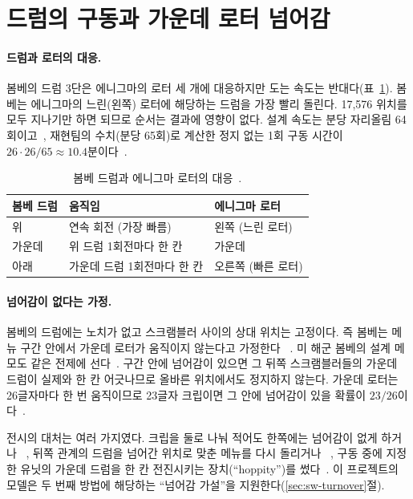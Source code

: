 \section{드럼의 구동과 가운데 로터 넘어감}\label{sec:turnover}

\paragraph{드럼과 로터의 대응.} 봄베의 드럼 3단은 에니그마의 로터 세 개에 대응하지만 도는 속도는
반대다(표~\ref{tab:drums}). 봄베는 에니그마의 느린(왼쪽) 로터에 해당하는 드럼을 가장 빨리 돌린다.
17,576 위치를 모두 지나기만 하면 되므로 순서는 결과에 영향이 없다. 설계 속도는 분당 자리올림
64회이고~\cite[59]{us6812report1944}, 재현팀의 수치(분당 65회)로 계산한 정지 없는 1회 구동 시간이
$26\cdot26/65 \approx 10.4$분이다~\cite{jackson-bh09,jackson-bh11}.

\begin{table}[ht]
\centering
\caption{봄베 드럼과 에니그마 로터의 대응~\cite[59, 73]{us6812report1944}.}
\label{tab:drums}
\begin{tabular}{lll}
\toprule
봄베 드럼 & 움직임 & 에니그마 로터 \\
\midrule
위 & 연속 회전 (가장 빠름) & 왼쪽 (느린 로터) \\
가운데 & 위 드럼 1회전마다 한 칸 & 가운데 \\
아래 & 가운데 드럼 1회전마다 한 칸 & 오른쪽 (빠른 로터) \\
\bottomrule
\end{tabular}
\end{table}

\paragraph{넘어감이 없다는 가정.} 봄베의 드럼에는 노치가 없고 스크램블러 사이의 상대 위치는 고정이다.
즉 봄베는 메뉴 구간 안에서 가운데 로터가 움직이지 않는다고 가정한다%
~\cite[4]{us6812report1944}. 미 해군 봄베의 설계 메모도 같은 전제에 선다~\cite{desch1942memo}. 구간 안에 넘어감이 있으면 그 뒤쪽 스크램블러들의 가운데
드럼이 실제와 한 칸 어긋나므로 올바른 위치에서도 정지하지 않는다. 가운데 로터는 26글자마다 한 번
움직이므로 23글자 크립이면 그 안에 넘어감이 있을 확률이 $23/26$이다~\cite{ellsbury1998bombe}.

전시의 대처는 여러 가지였다. 크립을 둘로 나눠 적어도 한쪽에는 넘어감이 없게 하거나%
~\cite{ellsbury1998bombe}, 뒤쪽 관계의 드럼을 넘어간 위치로 맞춘 메뉴를 다시 돌리거나%
~\cite[37]{us6812report1944}, 구동 중에 지정한 유닛의 가운데 드럼을 한 칸 전진시키는 장치(``hoppity'')를
썼다~\cite[38]{us6812report1944}. 이 프로젝트의 모델은 두 번째 방법에 해당하는 ``넘어감 가설''을
지원한다(\ref{sec:sw-turnover}절).

